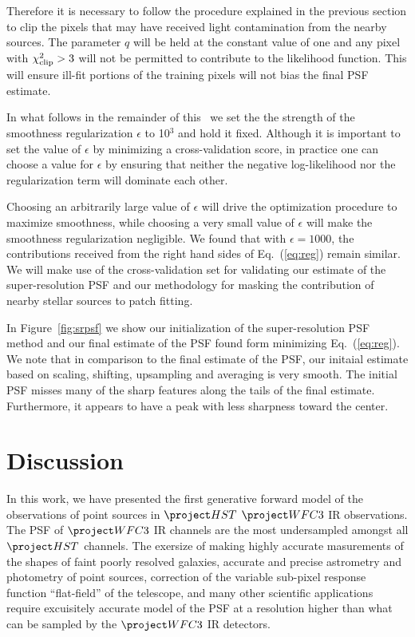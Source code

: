 Therefore it is necessary to follow the procedure explained in the previous section to clip the pixels that may have received light 
contamination from the nearby sources. The parameter $q$ will be held at the constant value of one and any pixel with $\chi^{2}_{\rm clip} > 3 $ 
will not be permitted to contribute to the likelihood function. 
This will ensure ill-fit portions of the training pixels will not bias the final PSF estimate. 

In what follows in the remainder of this \paper\, we set the the strength of the smoothness regularization $\epsilon$ to 10$^{3}$ and hold 
it fixed. Although it is important to set the value of $\epsilon$ by minimizing a cross-validation score, in practice one can choose a 
value for $\epsilon$ by ensuring that neither the negative log-likelihood nor the regularization term will dominate each other. 

Choosing an arbitrarily large value of $\epsilon$ will drive the optimization procedure to maximize smoothness, while choosing a very small 
value of $\epsilon$ will make the smoothness regularization negligible. We found that with $\epsilon = 1000$, the contributions received from the 
right hand sides of Eq.~(\ref{eq:reg}) remain similar. We will make use of the cross-validation set for validating our estimate of the 
super-resolution PSF and our methodology for masking the contribution of nearby stellar sources to patch fitting.  

In Figure~\ref{fig:srpsf} we show our initialization of the super-resolution PSF method and our final estimate of the PSF found form 
minimizing Eq.~(\ref{eq:reg}). We note that in comparison to the final estimate of the PSF, our initaial estimate based on scaling, shifting, 
upsampling and averaging is very smooth. The initial PSF misses many of the sharp features along the tails of the final estimate. Furthermore, 
it appears to have a peak with less sharpness toward the center.

 


\section{Discussion}\label{sec:summary}

In this work, we have presented the first generative forward model of the observations of point sources in $\hst$ $\wfc$ IR 
observations. The PSF of $\wfc$ IR channels are the most undersampled amongst all $\hst$ channels. 
The exersize of making highly accurate masurements of the shapes of faint poorly resolved galaxies, accurate and precise astrometry and photometry of point sources, 
correction of the variable sub-pixel response function ``flat-field'' of the telescope, and many other scientific applications require excuisitely accurate model of 
the PSF at a resolution higher than what can be sampled by the $\wfc$ IR detectors. 

